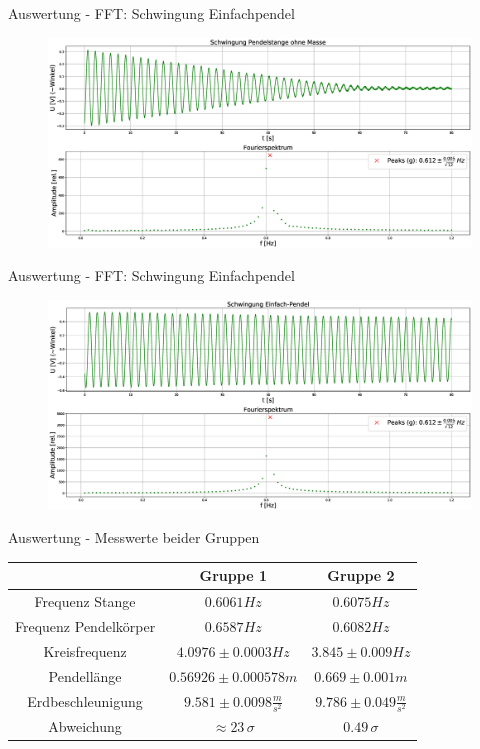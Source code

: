 \documentclass[12pt]{beamer}
\begin{document}
\begin{frame}{Auswertung - FFT: Schwingung Einfachpendel}
\begin{figure}[h]
\centering
\includegraphics[width=1\textwidth,height=0.75\textheight]{Stange.eps}
\end{figure}
\end{frame}

\begin{frame}{Auswertung - FFT: Schwingung Einfachpendel}
\begin{figure}[h]
\centering
\includegraphics[width=1\textwidth,height=0.75\textheight]{Einfachpendel.eps}
\end{figure}
\end{frame}


\begin{frame}{Auswertung - Messwerte beider Gruppen}

\begin{table}
\small
\centering
\renewcommand{\arraystretch}{1.5}
	\begin{tabular}{ccc}
	\hline
	& Gruppe 1 & Gruppe 2 \\
	\hline
	Frequenz Stange &$0.6061 Hz$ & $0.6075 Hz$ \\
	\hline 
	Frequenz Pendelkörper &$0.6587 Hz$ & $0.6082 Hz$ \\
	\hline
	Kreisfrequenz & $4.0976 \pm 0.0003 Hz$ & $ 3.845 \pm 0.009 Hz$\\
	\hline
	Pendellänge & $ 0.56926 \pm 0.000578 m$ & $0.669 \pm 0.001 m$\\
	\hline
	Erdbeschleunigung & $9.581 \pm 0.0098\frac{m}{s^2} $ & $9.786 \pm 0.049 \frac{m}{s^2}$\\
	\hline
	Abweichung & $\approx 23\, \sigma$ & $0.49\, \sigma$ \\
	\hline
	\end{tabular}
\end{table}

\end{frame}
\end{document}
